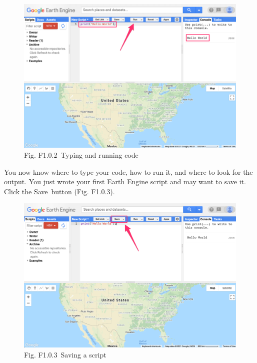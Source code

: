 \documentclass[
  letterpaper,
  DIV=11,
  numbers=noendperiod]{scrreprt}
\begin{document}
\begin{figure}

{\centering \includegraphics{./F1/image57.png}

}

\caption{Fig. F1.0.2~Typing and running code}

\end{figure}

You now know where to type your code, how to run it, and where to look
for the output. You just wrote your first Earth Engine script and may
want to save it. Click the Save~button (Fig. F1.0.3).

\begin{figure}

{\centering \includegraphics{./F1/image5.png}

}

\caption{Fig. F1.0.3~Saving a script}

\end{figure}
\end{document}
